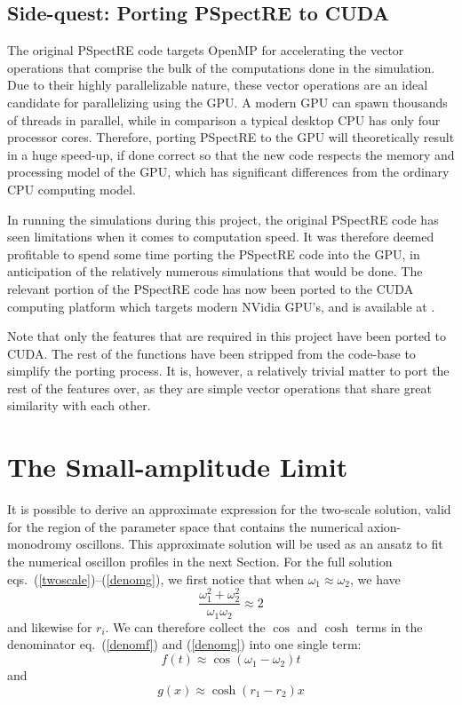 \documentclass{report}
\begin{document}
\subsection{Side-quest: Porting PSpectRE to CUDA}
The original PSpectRE code targets OpenMP for accelerating the vector operations that comprise the bulk of the computations done in the simulation. Due to their highly parallelizable nature, these vector operations are an ideal candidate for parallelizing using the GPU. A modern GPU can spawn thousands of threads in parallel, while in comparison a typical desktop CPU has only four processor cores. Therefore, porting PSpectRE to the GPU will theoretically result in a huge speed-up, if done correct so that the new code respects the memory and processing model of the GPU, which has significant differences from the ordinary CPU computing model.

In running the simulations during this project, the original PSpectRE code has seen limitations when it comes to computation speed. It was therefore deemed profitable to spend some time porting the PSpectRE code into the GPU, in anticipation of the relatively numerous simulations that would be done. The relevant portion of the PSpectRE code has now been ported to the CUDA computing platform which targets modern NVidia GPU's, and is available at \cite{cudaport}.

Note that only the features that are required in this project have been ported to CUDA. The rest of the functions have been stripped from the code-base to simplify the porting process. It is, however, a relatively trivial matter to port the rest of the features over, as they are simple vector operations that share great similarity with each other.

\section{The Small-amplitude Limit}
It is possible to derive an approximate expression for the two-scale solution, valid for the region of the parameter space that contains the numerical axion-monodromy oscillons. This approximate solution will be used as an ansatz to fit the numerical oscillon profiles in the next Section. For the full solution eqs.~(\ref{twoscale})--(\ref{denomg}), we first notice that when $\omega_1\approx\omega_2$, we have
\begin{equation}
  \frac{\omega_1^2+\omega_2^2}{\omega_1 \omega_2} \approx 2
\end{equation}
and likewise for $r_i$. We can therefore collect the $\cos$ and $\cosh$ terms in the denominator eq.~(\ref{denomf}) and (\ref{denomg}) into one single term:
\begin{equation}
  f(t) \approx \cos (\omega_1-\omega_2) t
\end{equation}
and
\begin{equation}
  g(x) \approx \cosh (r_1-r_2) x
\end{equation}
\end{document}
